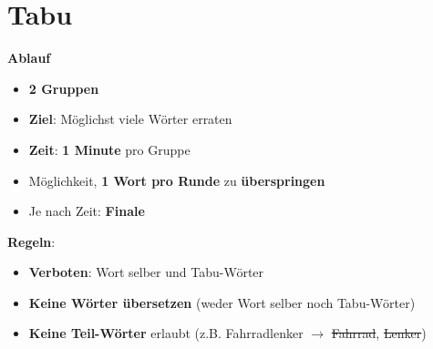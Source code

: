 \geometry{paperwidth=22cm, paperheight=8cm, margin=0.5cm}



\pagestyle{empty}

\huge
\newcommand{\tabucard}[2]{
    \begin{tcolorbox}[
        colback=white,
        colframe=RoyalBlue,
        boxrule=2pt,
        arc=0pt,
        height=\textheight,
        width=\textwidth,
        valign=center,
        halign=center,
        nobeforeafter
    ]
        \vspace*{\fill}
        \begin{center}
            \textbf{\Huge #1}
            
            \vspace{1.5cm}
            
            \begin{tcolorbox}[
                colback=RoyalBlue!10,
                colframe=RoyalBlue,
                boxrule=1.5pt,
                arc=4pt,
                width=0.85\textwidth,
                nobeforeafter
            ]
                \textbf{\Large Tabu-Wörter:} \\[0.5cm]
                \Large #2
            \end{tcolorbox}
        \end{center}
        \vspace*{\fill}
    \end{tcolorbox}
    \newpage
}


\section*{\Huge Tabu}
\textbf{Ablauf}
\begin{itemize}
\item \textbf{2 Gruppen}
\item \textbf{Ziel}: Möglichst viele Wörter erraten
\item {} \textbf{Zeit}: \textbf{1 Minute} pro Gruppe 
\item Möglichkeit, \textbf{1 Wort pro Runde} zu \textbf{überspringen}
\item Je nach Zeit: \textbf{Finale} 
\end{itemize}

\textbf{Regeln}:
\begin{itemize}
\item \textbf{Verboten}: Wort selber und Tabu-Wörter
\item \textbf{Keine Wörter übersetzen} (weder Wort selber noch Tabu-Wörter)
\item \textbf{Keine Teil-Wörter} erlaubt (z.B. Fahrradlenker $\rightarrow$ \sout{Fahrrad}, \sout{Lenker})
\end{itemize}


